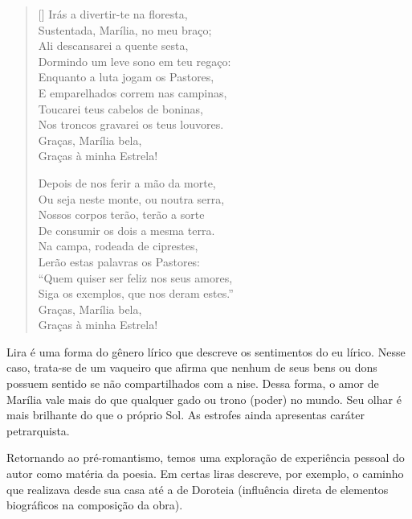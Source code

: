 \documentclass[12pt]{book}
\begin{document}
\begin{verse}[\versewidth]
					Irás a divertir-te na floresta, \\
					Sustentada, Marília, no meu braço; \\
					Ali descansarei a quente sesta, \\
					Dormindo um leve sono em teu regaço: \\
					Enquanto a luta jogam os Pastores, \\
					E emparelhados correm nas campinas, \\
					Toucarei teus cabelos de boninas, \\
					Nos troncos gravarei os teus louvores. \\
					\hspace{2em} Graças, Marília bela, \\
					\hspace{2em} Graças à minha Estrela!
					
					Depois de nos ferir a mão da morte, \\
					Ou seja neste monte, ou noutra serra, \\
					Nossos corpos terão, terão a sorte \\
					De consumir os dois a mesma terra. \\
					Na campa, rodeada de ciprestes, \\
					Lerão estas palavras os Pastores: \\
					“Quem quiser ser feliz nos seus amores, \\
					Siga os exemplos, que nos deram estes.” \\
					\hspace{2em} Graças, Marília bela, \\
					\hspace{2em} Graças à minha Estrela! \\
				\end{verse}
				\par Lira é uma forma do gênero lírico que descreve os sentimentos do eu lírico. Nesse caso, trata-se de um vaqueiro que afirma que nenhum de seus bens ou dons possuem sentido se não compartilhados com a nise. Dessa forma, o amor de Marília vale mais do que qualquer gado ou trono (poder) no mundo. Seu olhar é mais brilhante do que o próprio Sol. As estrofes ainda apresentas caráter petrarquista.
				\par Retornando ao pré-romantismo, temos uma exploração de experiência pessoal do autor como matéria da poesia. Em certas liras descreve, por exemplo, o caminho que realizava desde sua casa até a de Doroteia (influência direta de elementos biográficos na composição da obra).
\end{document}

